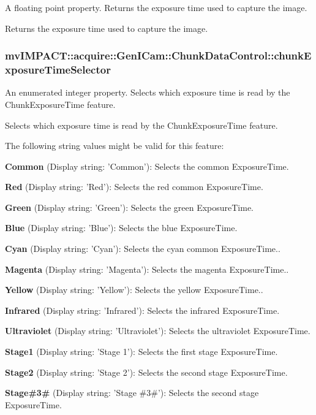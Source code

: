 A floating point property. Returns the exposure time used to capture the image. 

Returns the exposure time used to capture the image. \hypertarget{classmv_i_m_p_a_c_t_1_1acquire_1_1_gen_i_cam_1_1_chunk_data_control_a54579ccb17b4adfac634b977c5a97341}{
\subsubsection[{chunk\+Exposure\+Time\+Selector}]{ mv\+I\+M\+P\+A\+C\+T\+::acquire\+::\+Gen\+I\+Cam\+::\+Chunk\+Data\+Control\+::chunk\+Exposure\+Time\+Selector}}\label{classmv_i_m_p_a_c_t_1_1acquire_1_1_gen_i_cam_1_1_chunk_data_control_a54579ccb17b4adfac634b977c5a97341}


An enumerated integer property. Selects which exposure time is read by the Chunk\+Exposure\+Time feature. 

Selects which exposure time is read by the Chunk\+Exposure\+Time feature.

The following string values might be valid for this feature\+:
\begin{DoxyItemize}
\item {\bfseries Common} (Display string\+: 'Common')\+: Selects the common Exposure\+Time.
\item {\bfseries Red} (Display string\+: 'Red')\+: Selects the red common Exposure\+Time.
\item {\bfseries Green} (Display string\+: 'Green')\+: Selects the green Exposure\+Time.
\item {\bfseries Blue} (Display string\+: 'Blue')\+: Selects the blue Exposure\+Time.
\item {\bfseries Cyan} (Display string\+: 'Cyan')\+: Selects the cyan common Exposure\+Time..
\item {\bfseries Magenta} (Display string\+: 'Magenta')\+: Selects the magenta Exposure\+Time..
\item {\bfseries Yellow} (Display string\+: 'Yellow')\+: Selects the yellow Exposure\+Time..
\item {\bfseries Infrared} (Display string\+: 'Infrared')\+: Selects the infrared Exposure\+Time.
\item {\bfseries Ultraviolet} (Display string\+: 'Ultraviolet')\+: Selects the ultraviolet Exposure\+Time.
\item {\bfseries Stage1} (Display string\+: 'Stage 1')\+: Selects the first stage Exposure\+Time.
\item {\bfseries Stage2} (Display string\+: 'Stage 2')\+: Selects the second stage Exposure\+Time.
\item {\bfseries Stage\#3\#} (Display string\+: 'Stage \#3\#')\+: Selects the second stage Exposure\+Time.
\end{DoxyItemize}

